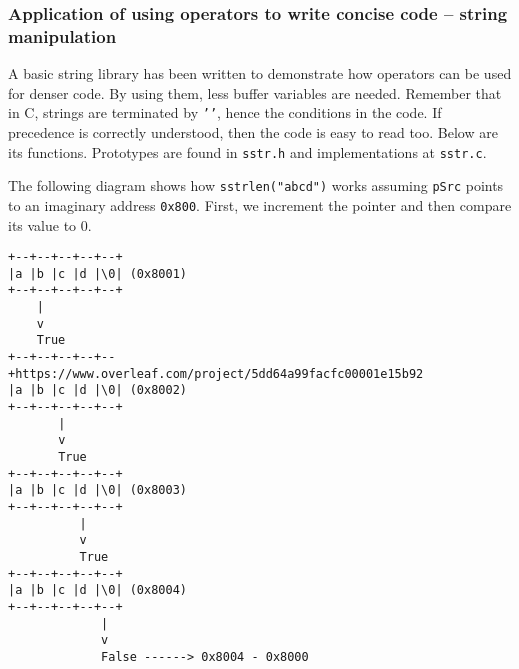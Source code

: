 \subsubsection{Application of using operators to write concise code -- string manipulation}

A basic string library has been written to demonstrate how operators can be used for denser code. By using them, less buffer variables are needed. Remember that in C, strings are terminated by \texttt{''}, hence the conditions in the code. If precedence is correctly understood, then the code is easy to read too. Below are its functions. Prototypes are found in \texttt{sstr.h} and implementations at \texttt{sstr.c}.


The following diagram shows how \texttt{sstrlen("abcd")} works assuming \texttt{pSrc} points to an imaginary address \texttt{0x800}. First, we increment the pointer and then compare its value to 0.
\begin{verbatim}
+--+--+--+--+--+
|a |b |c |d |\0| (0x8001)
+--+--+--+--+--+
    |
    v
    True     
+--+--+--+--+--+https://www.overleaf.com/project/5dd64a99facfc00001e15b92
|a |b |c |d |\0| (0x8002)
+--+--+--+--+--+
       | 
       v
       True     
+--+--+--+--+--+
|a |b |c |d |\0| (0x8003)
+--+--+--+--+--+
          | 
          v
          True
+--+--+--+--+--+
|a |b |c |d |\0| (0x8004)
+--+--+--+--+--+
             |
             v
             False ------> 0x8004 - 0x8000
\end{verbatim}










